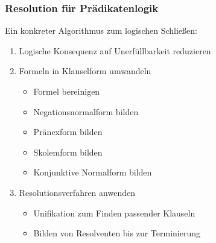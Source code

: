 \documentclass[aspectratio=1610,onlymath]{beamer}
\begin{document}
\maketitle

\begin{frame}\frametitle{Resolution für Prädikatenlogik}

Ein konkreter Algorithmus zum logischen Schließen:
\begin{enumerate}[(1)]
\item \alert{Logische Konsequenz auf Unerfüllbarkeit reduzieren}
\item \alert{Formeln in Klauselform umwandeln}
	\begin{itemize}
	\item Formel bereinigen
	\item Negationsnormalform bilden
	\item Pränexform bilden
	\item Skolemform bilden
	\item Konjunktive Normalform bilden
	\end{itemize}
\item \alert{Resolutionsverfahren anwenden}
	\begin{itemize}
	\item \textcolor{devilscss}{Unifikation zum Finden passender Klauseln}
	\item \textcolor{devilscss}{Bilden von Resolventen bis zur Terminierung}
	\end{itemize}
\end{enumerate}

\end{frame}
\end{document}
